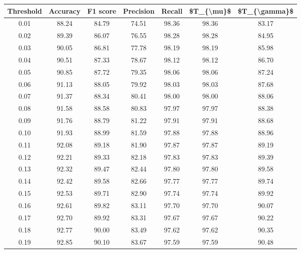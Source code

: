 \begin{tabular}{|c|c|c|c|c|c|c|}
\hline
 Threshold &  Accuracy &  F1 score &  Precision &  Recall &  \$T\_\{\textbackslash mu\}\$ &  \$T\_\{\textbackslash gamma\}\$ \\
\hline
      0.01 &     88.24 &     84.79 &      74.51 &   98.36 &      98.36 &         83.17 \\
      0.02 &     89.39 &     86.07 &      76.55 &   98.28 &      98.28 &         84.95 \\
      0.03 &     90.05 &     86.81 &      77.78 &   98.19 &      98.19 &         85.98 \\
      0.04 &     90.51 &     87.33 &      78.67 &   98.12 &      98.12 &         86.70 \\
      0.05 &     90.85 &     87.72 &      79.35 &   98.06 &      98.06 &         87.24 \\
      0.06 &     91.13 &     88.05 &      79.92 &   98.03 &      98.03 &         87.68 \\
      0.07 &     91.37 &     88.34 &      80.41 &   98.00 &      98.00 &         88.06 \\
      0.08 &     91.58 &     88.58 &      80.83 &   97.97 &      97.97 &         88.38 \\
      0.09 &     91.76 &     88.79 &      81.22 &   97.91 &      97.91 &         88.68 \\
      0.10 &     91.93 &     88.99 &      81.59 &   97.88 &      97.88 &         88.96 \\
      0.11 &     92.08 &     89.18 &      81.90 &   97.87 &      97.87 &         89.19 \\
      0.12 &     92.21 &     89.33 &      82.18 &   97.83 &      97.83 &         89.39 \\
      0.13 &     92.32 &     89.47 &      82.44 &   97.80 &      97.80 &         89.58 \\
      0.14 &     92.42 &     89.58 &      82.66 &   97.77 &      97.77 &         89.74 \\
      0.15 &     92.53 &     89.71 &      82.90 &   97.74 &      97.74 &         89.92 \\
      0.16 &     92.61 &     89.82 &      83.11 &   97.70 &      97.70 &         90.07 \\
      0.17 &     92.70 &     89.92 &      83.31 &   97.67 &      97.67 &         90.22 \\
      0.18 &     92.77 &     90.00 &      83.49 &   97.62 &      97.62 &         90.35 \\
      0.19 &     92.85 &     90.10 &      83.67 &   97.59 &      97.59 &         90.48 \\

\end{tabular}
